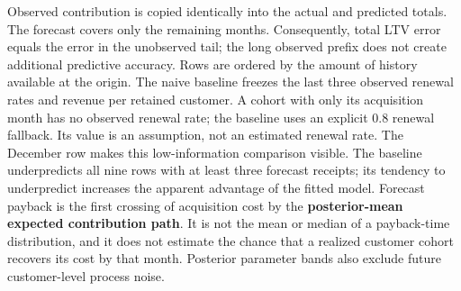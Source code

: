 \documentclass[10pt]{article}
\begin{document}
Observed contribution is copied identically into the actual and predicted totals. The forecast covers only the remaining months. Consequently, total LTV error equals the error in the unobserved tail; the long observed prefix does not create additional predictive accuracy. Rows are ordered by the amount of history available at the origin.
The naive baseline freezes the last three observed renewal rates and revenue per retained customer. A cohort with only its acquisition month has no observed renewal rate; the baseline uses an explicit 0.8 renewal fallback. Its value is an assumption, not an estimated renewal rate. The December row makes this low-information comparison visible. The baseline underpredicts all nine rows with at least three forecast receipts; its tendency to underpredict increases the apparent advantage of the fitted model.
Forecast payback is the first crossing of acquisition cost by the \textbf{posterior-mean expected contribution path}. It is not the mean or median of a payback-time distribution, and it does not estimate the chance that a realized customer cohort recovers its cost by that month. Posterior parameter bands also exclude future customer-level process noise.
\end{document}
